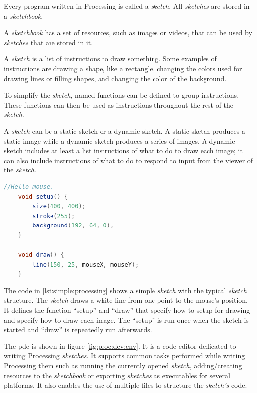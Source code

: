 \documentclass{./llncs2e/llncs}
\begin{document}
	Every program written in Processing is called a \emph{sketch}. 
	All \emph{sketches} are stored in a \emph{sketchbook}.

	A \emph{sketchbook} has a set of resources, such as images or videos, that can be used by \emph{sketches} that are stored in it.

	A \emph{sketch} is a list of instructions to draw something. 
	Some examples of instructions are drawing a shape, like a rectangle, changing the colors used for drawing lines or filling shapes, and changing the color of the background.

	To simplify the \emph{sketch}, named functions can be defined to group instructions. 
	These functions can then be used as instructions throughout the rest of the \emph{sketch}.

	A \emph{sketch} can be a static sketch or a dynamic sketch. 
	A static sketch produces a static image while a dynamic sketch produces a series of images. 
	A dynamic sketch includes at least a list instructions of what to do to draw each image; it can also include instructions of what to do to respond to input from the viewer of the \emph{sketch}.

	\begin{lstlisting}[caption={A simple Processing sketch},label={lst:simple:processing},language=Java]
	//Hello mouse.
	void setup() {
	    size(400, 400);
	    stroke(255);
	    background(192, 64, 0);
	}
	 
	void draw() {
	    line(150, 25, mouseX, mouseY);
	}
	\end{lstlisting}

	The code in \ref{lst:simple:processing} shows a simple \emph{sketch} with the typical \emph{sketch} structure. 
	The \emph{sketch} draws a white line from one point to the mouse's position. 
	It defines the function ``setup'' and  ``draw'' that specify how to setup for drawing and specify how to draw each image. 
	The ``setup'' is run once when the sketch is started and ``draw'' is repeatedly run afterwards.

	The \ac{pde} is shown in figure \ref{fig:proc:dev:env}. 
	It is a code editor dedicated to writing Processing \emph{sketches}. 
	It supports common tasks performed while writing Processing them such as running the currently opened \emph{sketch}, adding/creating resources to the \emph{sketchbook} or exporting \emph{sketches} as executables for several platforms. 
	It also enables the use of multiple files to structure the \emph{sketch's} code.
\end{document}
